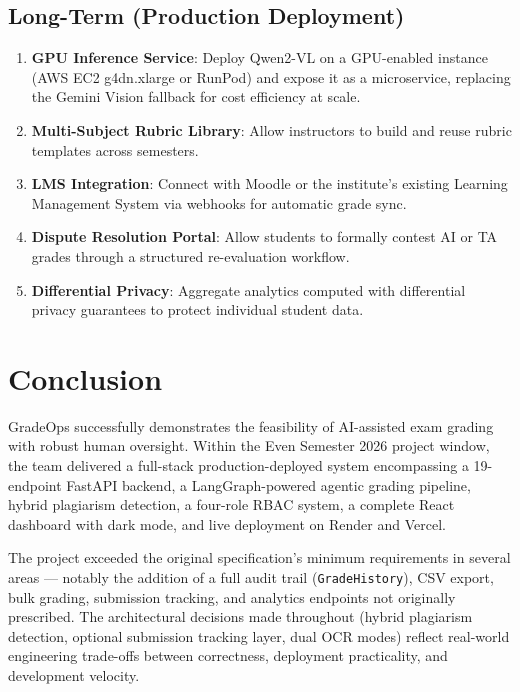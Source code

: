 \documentclass[12pt,a4paper]{article}
\begin{document}
\subsection{Long-Term (Production Deployment)}

\begin{enumerate}[leftmargin=*, noitemsep]
  \item \textbf{GPU Inference Service}: Deploy Qwen2-VL on a GPU-enabled instance (AWS EC2 g4dn.xlarge or RunPod) and expose it as a microservice, replacing the Gemini Vision fallback for cost efficiency at scale.
  \item \textbf{Multi-Subject Rubric Library}: Allow instructors to build and reuse rubric templates across semesters.
  \item \textbf{LMS Integration}: Connect with Moodle or the institute's existing Learning Management System via webhooks for automatic grade sync.
  \item \textbf{Dispute Resolution Portal}: Allow students to formally contest AI or TA grades through a structured re-evaluation workflow.
  \item \textbf{Differential Privacy}: Aggregate analytics computed with differential privacy guarantees to protect individual student data.
\end{enumerate}

\section{Conclusion}

GradeOps successfully demonstrates the feasibility of AI-assisted exam grading with robust human oversight. Within the Even Semester 2026 project window, the team delivered a full-stack production-deployed system encompassing a 19-endpoint FastAPI backend, a LangGraph-powered agentic grading pipeline, hybrid plagiarism detection, a four-role RBAC system, a complete React dashboard with dark mode, and live deployment on Render and Vercel.

The project exceeded the original specification's minimum requirements in several areas — notably the addition of a full audit trail (\texttt{GradeHistory}), CSV export, bulk grading, submission tracking, and analytics endpoints not originally prescribed. The architectural decisions made throughout (hybrid plagiarism detection, optional submission tracking layer, dual OCR modes) reflect real-world engineering trade-offs between correctness, deployment practicality, and development velocity.
\end{document}
